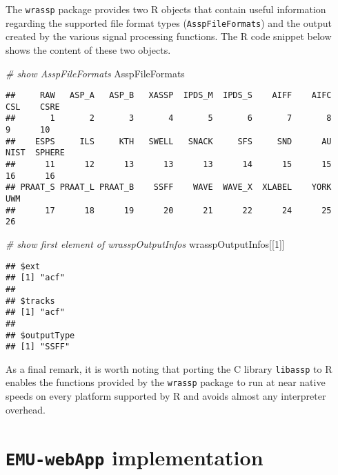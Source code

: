 \documentclass[
]{book}
\newenvironment{Shaded}{\begin{snugshade}}{\end{snugshade}}
\newcommand{\CommentTok}[1]{\textcolor[rgb]{0.56,0.35,0.01}{\textit{#1}}}
\newcommand{\DecValTok}[1]{\textcolor[rgb]{0.00,0.00,0.81}{#1}}
\newcommand{\NormalTok}[1]{#1}
\begin{document}
The \texttt{wrassp} package provides two R objects that contain useful information regarding the supported file format types (\texttt{AsspFileFormats}) and the output created by the various signal processing functions. The R code snippet below shows the content of these two objects.

\begin{Shaded}
\begin{Highlighting}[]
\CommentTok{\# show AsspFileFormats}
\NormalTok{AsspFileFormats}
\end{Highlighting}
\end{Shaded}

\begin{verbatim}
##     RAW   ASP_A   ASP_B   XASSP  IPDS_M  IPDS_S    AIFF    AIFC     CSL    CSRE 
##       1       2       3       4       5       6       7       8       9      10 
##    ESPS     ILS     KTH   SWELL   SNACK     SFS     SND      AU    NIST  SPHERE 
##      11      12      13      13      13      14      15      15      16      16 
## PRAAT_S PRAAT_L PRAAT_B    SSFF    WAVE  WAVE_X  XLABEL    YORK     UWM 
##      17      18      19      20      21      22      24      25      26
\end{verbatim}

\begin{Shaded}
\begin{Highlighting}[]
\CommentTok{\# show first element of wrasspOutputInfos}
\NormalTok{wrasspOutputInfos[[}\DecValTok{1}\NormalTok{]]}
\end{Highlighting}
\end{Shaded}

\begin{verbatim}
## $ext
## [1] "acf"
## 
## $tracks
## [1] "acf"
## 
## $outputType
## [1] "SSFF"
\end{verbatim}

As a final remark, it is worth noting that porting the C library \texttt{libassp} to R enables the functions provided by the \texttt{wrassp} package to run at near native speeds on every platform supported by R and avoids almost any interpreter overhead.

\hypertarget{chap:emu-webAppImplementation}{%
\chapter{\texorpdfstring{\texttt{EMU-webApp} implementation}{EMU-webApp implementation}}\label{chap:emu-webAppImplementation}}
\end{document}
